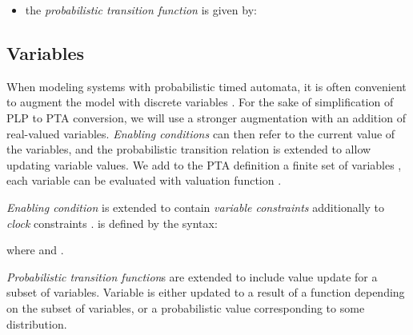 \begin{itemize}
\item the \textit{\textit{probabilistic transition function}} is given by:  
\end{itemize}
\begin{center}  \end{center}
\subsection{Variables}
When modeling systems with probabilistic timed automata, it is often convenient to augment the model with discrete variables \cite{behrmann2006uppaal} \cite{tri98}. For the sake of simplification of PLP to PTA conversion, we will use a stronger augmentation with an addition of real-valued variables. \textit{Enabling conditions} can then refer to the current value of the variables, and the probabilistic transition relation is extended to allow updating variable values. We add to the PTA definition a finite set of variables  , each variable can be evaluated with valuation function . 
\par \textit{Enabling condition} is extended to contain \textit{variable constraints} additionally to \textit{clock} constraints .  is defined by the syntax: \begin{center} \end{center}
where  and .
\par \textit{\textit{Probabilistic transition function}}s are extended to include value update for a subset of variables. Variable is either updated to a result of a function depending on the subset of variables, or a probabilistic value corresponding to some distribution. \\

